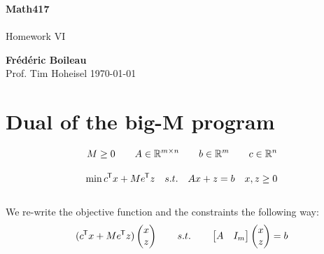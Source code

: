 \documentclass{article}
\newcommand*{\tran}{^{\mkern-1.5mu\mathsf{T}}}%
\begin{document}
	\begin{titlepage}
		\begin{center}
			\vspace*{1cm}
			\textbf{Math417}\\
			\\
			\vspace{0.5cm}
			Homework VI
			
			\vspace{1.5cm}
			
			\textbf{Frédéric Boileau}\\
			\vspace{2cm}
			Prof. 
			Tim Hoheisel
			\vfill
			\today
			\thispagestyle{empty}
		\end{center}
	\end{titlepage}
	\newpage
	\tableofcontents
	\thispagestyle{empty}
	\clearpage
	
	\section{Dual of the big-M program}
	\vspace{1cm}
	
	\begin{align}
		M\geq 0 \qquad A \in \mathbb{R}^{m\times n} \qquad b\in \mathbb R^{m} \qquad c \in \mathbb{R}^n\\[2ex]
		\min c\tran x + M e\tran z \quad s.t. \quad Ax+z = b \quad x,z \geq 0
	\end{align}\\
	
	We re-write the objective function and the constraints the following way:
	\begin{align}\label{compresser}
		(c\tran x + Me\tran z )\begin{pmatrix} x \\ z \end{pmatrix} \qquad s.t. \qquad
		\begin{bmatrix} A &I_m \end{bmatrix} \begin{pmatrix} x\\z \end{pmatrix}  = 	 b 
	\end{align}
\end{document}
